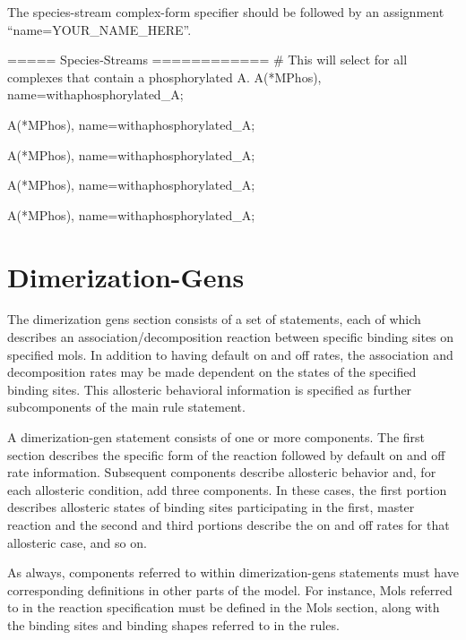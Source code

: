 The species-stream complex-form specifier should be followed by an assignment
``name=YOUR\_NAME\_HERE''.

\begin{ExampleMZR}
===== Species-Streams ============
# This will select for all complexes that contain a phosphorylated A.
A(*M{Phos}), 
       name=withaphosphorylated\_A;

A(*M{Phos}), 
       name=withaphosphorylated\_A;


A(*M{Phos}), 
       name=withaphosphorylated\_A;


A(*M{Phos}), 
       name=withaphosphorylated\_A;


A(*M{Phos}), 
       name=withaphosphorylated\_A;

\end{ExampleMZR}


\section{Dimerization-Gens}
The dimerization gens section consists of a set of statements, each of
which describes an association/decomposition reaction between specific
binding sites on specified mols.  In addition to having default on and
off rates, the association and decomposition rates may be made
dependent on the states of the specified binding sites.  This
allosteric behavioral information is specified as further
subcomponents of the main rule statement.  

A dimerization-gen statement consists of one or more components.  The
first section describes the specific form of the reaction followed by
default on and off rate information.  Subsequent components describe
allosteric behavior and, for each allosteric condition, add three
components. In these cases, the first portion describes allosteric
states of binding sites participating in the first, master reaction
and the second and third portions describe the on and off rates for
that allosteric case, and so on.

As always, components referred to within dimerization-gens statements
must have corresponding definitions in other parts of the model.  For
instance, Mols referred to in the reaction specification must be
defined in the Mols section, along with the binding sites and binding
shapes referred to in the rules.  

